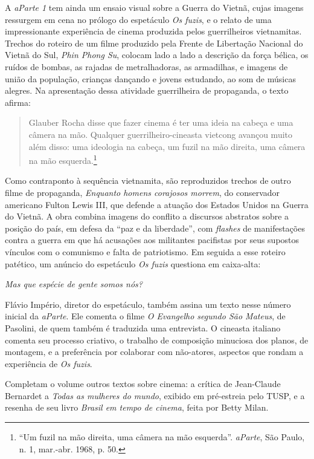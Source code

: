 A \textit{aParte 1} tem ainda um ensaio visual sobre a Guerra do Vietnã,
cujas imagens ressurgem em cena no prólogo do espetáculo \textit{Os fuzis},
e o relato de uma impressionante experiência de cinema produzida pelos
guerrilheiros vietnamitas. Trechos do roteiro de um filme produzido pela
Frente de Libertação Nacional do Vietnã do Sul, \textit{Phin Phong Su},
colocam lado a lado a descrição da força bélica, os ruídos de bombas, as
rajadas de metralhadoras, as armadilhas, e imagens de união da
população, crianças dançando e jovens estudando, ao som de músicas
alegres. Na apresentação dessa atividade guerrilheira de propaganda, o
texto afirma:

\begin{quote}
Glauber Rocha disse que fazer cinema é ter uma ideia na cabeça e uma
câmera na mão. Qualquer guerrilheiro-cineasta vietcong avançou muito
além disso: uma ideologia na cabeça, um fuzil na mão direita, uma câmera
na mão esquerda.\footnote{“Um fuzil na mão direita, uma câmera na mão
  esquerda”. \textit{aParte}, São Paulo, n. 1, mar.-abr. 1968, p. 50.}
\end{quote}

Como contraponto à sequência vietnamita, são reproduzidos trechos de
outro filme de propaganda, \textit{Enquanto homens corajosos morrem}, do
conservador americano Fulton Lewis III, que defende a atuação dos
Estados Unidos na Guerra do Vietnã. A obra combina imagens do conflito a
discursos abstratos sobre a posição do país, em defesa da “paz e da
liberdade”, com \textit{flashes} de manifestações contra a guerra em que há
acusações aos militantes pacifistas por seus supostos vínculos com o
comunismo e falta de patriotismo. Em seguida a esse roteiro patético, um
anúncio do espetáculo \textit{Os fuzis} questiona em caixa-alta:

\textit{Mas que espécie de gente somos nós?}

Flávio Império, diretor do espetáculo, também assina um texto nesse
número inicial da \textit{aParte}. Ele comenta o filme \textit{O Evangelho
segundo São Mateus}, de Pasolini, de quem também é traduzida uma
entrevista. O cineasta italiano comenta seu processo criativo, o
trabalho de composição minuciosa dos planos, de montagem, e a
preferência por colaborar com não-atores, aspectos que rondam a
experiência de \textit{Os fuzis}.

Completam o volume outros textos sobre cinema: a crítica de Jean-Claude
Bernardet a \textit{Todas as mulheres do mundo}, exibido em pré-estreia
pelo TUSP, e a resenha de seu livro \textit{Brasil em tempo de cinema},
feita por Betty Milan.

